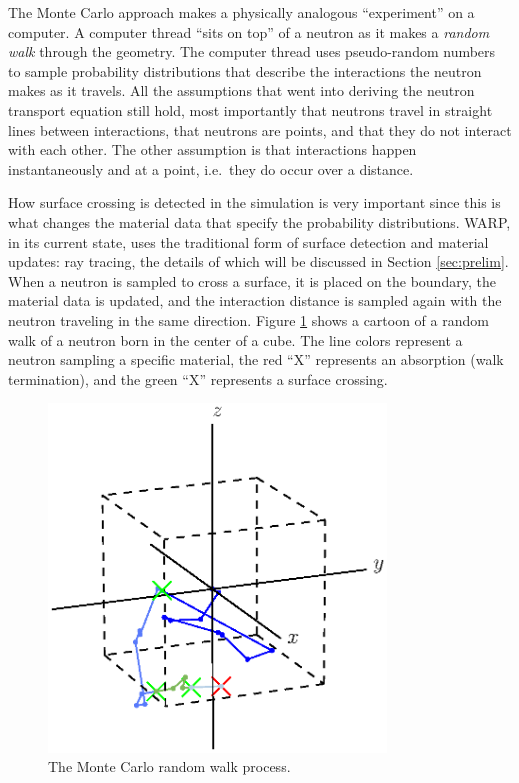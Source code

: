 The Monte Carlo approach makes a physically analogous ``experiment'' on a computer.  A computer thread ``sits on top'' of a neutron as it makes a \emph{random walk} through the geometry.  The computer thread uses pseudo-random numbers to sample probability distributions that describe the interactions the neutron makes as it travels.  All the assumptions that went into deriving the neutron transport equation still hold, most importantly that neutrons travel in straight lines between interactions, that neutrons are points, and that they do not interact with each other.  The other assumption is that interactions happen instantaneously and at a point, i.e.\ they do occur over a distance.  

How surface crossing is detected in the simulation is very important since this is what changes the material data that specify the probability distributions.  WARP, in its current state, uses the traditional form of surface detection and material updates: ray tracing, the details of which will be discussed in Section \ref{sec:prelim}.  When a neutron is sampled to cross a surface, it is placed on the boundary, the material data is updated, and the interaction distance is sampled again with the neutron traveling in the same direction.  Figure \ref{random_walk} shows a cartoon of a random walk of a neutron born in the center of a cube.  The line colors represent a neutron sampling a specific material, the red ``X'' represents an absorption (walk termination), and the green ``X'' represents a surface crossing.

\begin{figure}[h!] 
  \centering
    \includegraphics[width=0.8\textwidth,trim= 0cm 2.5cm 0cm 0cm]{graphics/random_walk_accepted.eps}
     \caption{The Monte Carlo random walk process. \label{random_walk}}
\end{figure}

